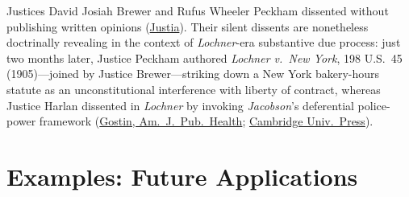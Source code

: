 \documentclass[12pt]{article}
\begin{document}
Justices David Josiah Brewer and Rufus Wheeler Peckham dissented without publishing written opinions (\href{https://supreme.justia.com/cases/federal/us/197/11/}{Justia}). Their silent dissents are nonetheless doctrinally revealing in the context of \textit{Lochner}-era substantive due process: just two months later, Justice Peckham authored \textit{Lochner v.\ New York}, 198 U.S.\ 45 (1905)---joined by Justice Brewer---striking down a New York bakery-hours statute as an unconstitutional interference with liberty of contract, whereas Justice Harlan dissented in \textit{Lochner} by invoking \textit{Jacobson}'s deferential police-power framework (\href{https://pmc.ncbi.nlm.nih.gov/articles/PMC1449223/}{Gostin, Am.\ J.\ Pub.\ Health}; \href{https://www.cambridge.org/core/books/covid19-and-the-law/jacobson-question/A463868C48886F30BD127463D9796626}{Cambridge Univ.\ Press}).

\section{Examples: Future Applications}
\end{document}
